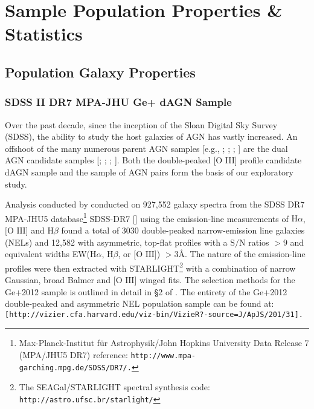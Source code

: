 \section{Sample Population Properties \& Statistics}
\subsection{Population Galaxy Properties}
\subsubsection{SDSS II DR7 MPA-JHU Ge+ dAGN Sample}

Over the past decade, since the inception of the Sloan Digital Sky Survey (SDSS), the ability to study the host galaxies of AGN has vastly increased. An offshoot of the many numerous parent AGN samples [e.g., \cite{Zakamska2003}; \cite{Kewley_2006}; \cite{Stasinska_2006}; \cite{Wild_2010}] are the dual AGN candidate samples [\cite{Smith_2010}; \cite{Liu_2012}; \cite{Ge_Hu_Wang_Bai_Zhang_2012}; \cite{2012ApJ...753...42C}]. Both the \cite{Ge_Hu_Wang_Bai_Zhang_2012} double-peaked [O III] profile candidate dAGN sample and the \cite{Liu_2012} sample of AGN pairs form the basis of our exploratory study. 

Analysis conducted by \cite{Ge_Hu_Wang_Bai_Zhang_2012} conducted on 927,552 galaxy spectra from the SDSS DR7 MPA-JHU5 database\footnote{\tiny{Max-Planck-Institut für Astrophysik/John Hopkins University Data Release 7 (MPA/JHU5 DR7) reference: \tt{http://www.mpa-garching.mpg.de/SDSS/DR7/}.}} SDSS-DR7 [\cite{2009ApJS..182..543A}] using the emission-line measurements of $\text{H}\alpha$, $\text{[O III]}$ and $\text{H}\beta$ found a total of 3030 double-peaked narrow-emission line galaxies (NELs) and 12,582 with asymmetric, top-ﬂat proﬁles with a $\text{S/N}$ ratios ${>}{9}$ and equivalent widths EW($\text{H}\alpha$, $\text{H}\beta$, or $\text{[O III]}$) ${>}{3}Å$. The nature of the emission-line profiles were then extracted with STARLIGHT\footnote{\tiny{The SEAGal/STARLIGHT spectral synthesis code: \tt{http://astro.ufsc.br/starlight/}}} with a combination of narrow Gaussian, broad Balmer and $\text{[O III]}$ winged fits. The selection methods for the Ge+2012 sample is outlined in detail in §2 of \cite{Ge_Hu_Wang_Bai_Zhang_2012}. The entirety of the Ge+2012 double-peaked and asymmetric NEL population sample can be found at: \tt{[http://vizier.cfa.harvard.edu/viz-bin/VizieR?-source=J/ApJS/201/31]}.

